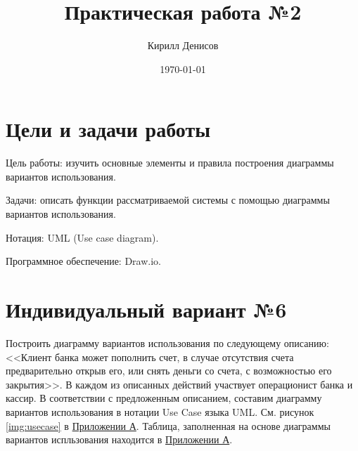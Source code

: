 \documentclass[a4paper,14pt]{extarticle}
\author{Кирилл Денисов}
\title{Практическая работа №2}
\date{\today}
\newcommand{\pathToCommonFolder}{/home/denilai/Desktop/LaTeX/Common}
\begin{document}
	\thispagestyle{empty}
	
	
	
	\newpage
	\tableofcontents
	\newpage
	
\section{Цели и задачи работы}
Цель работы: изучить основные элементы и правила построения диаграммы
вариантов использования.

Задачи: описать функции рассматриваемой системы с помощью диаграммы
вариантов использования.

Нотация: UML (Use case diagram).

Программное обеспечение: Draw.io.
\section{Индивидуальный вариант №6}
\begin{problem}
Построить диаграмму вариантов использования по следующему описанию: <<Клиент банка может пополнить счет, в случае отсутствия счета предварительно открыв его, или снять деньги со счета, с возможностью его закрытия>>. В каждом из описанных действий участвует операционист банка и кассир.
\nonum В соответствии с предложенным описанием, составим диаграмму вариантов использования в нотации Use Case языка UML. См. рисунок \ref{img:usecase} в \hyperref[tam]{Приложении А}.
Таблица, заполненная на основе диаграммы вариантов испльзования находится в \hyperref[tam]{Приложении А}.

\end {problem}
\end{document}
